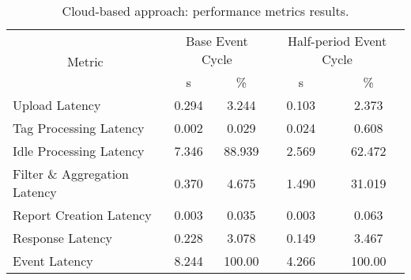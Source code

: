 \begin{table}[ht!]
\centering
\caption{Cloud-based approach: performance metrics results.}
\label{table:cloud_metrics}
\begin{tabular}{|l|c|c|c|c|}
\hline
\multicolumn{1}{|c|}{\multirow{2}{*}{Metric}} & \multicolumn{2}{c|}{Base Event Cycle} & \multicolumn{2}{c|}{Half-period Event Cycle} \\
\multicolumn{1}{|c|}{}                        & s                 & \%                & s                    & \%                    \\ \hline
Upload Latency                                & 0.294             & 3.244             & 0.103                & 2.373                 \\ \hline
Tag Processing Latency                        & 0.002             & 0.029             & 0.024                & 0.608                 \\ \hline
Idle Processing Latency                       & 7.346             & 88.939            & 2.569                & 62.472                \\ \hline
Filter \& Aggregation Latency                 & 0.370             & 4.675             & 1.490                & 31.019                \\ \hline
Report Creation Latency                       & 0.003             & 0.035             & 0.003                & 0.063                 \\ \hline
Response Latency                              & 0.228             & 3.078             & 0.149                & 3.467                 \\ \hline
Event Latency                                 & 8.244             & 100.00            & 4.266                & 100.00                \\ \hline
\end{tabular}
\end{table}

